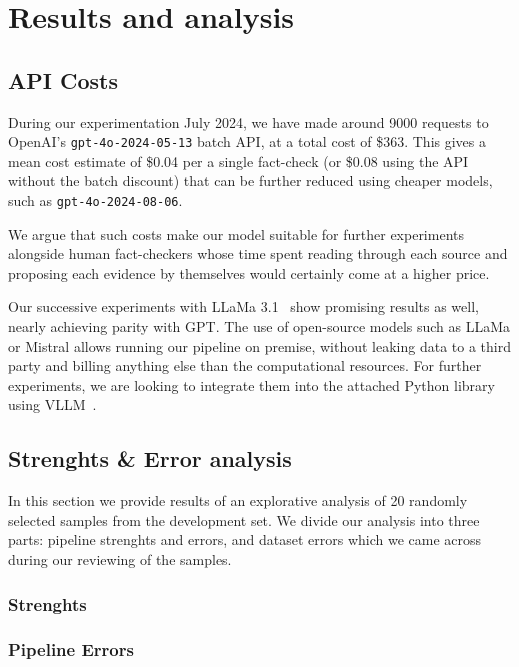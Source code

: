 
\section{Results and analysis}
\label{sec:results}



\subsection{API Costs}
During our experimentation July 2024, we have made around 9000 requests to OpenAI's \texttt{gpt-4o-2024-05-13} batch API, at a total cost of \$363.
This gives a mean cost estimate of \$0.04 per a single fact-check (or \$0.08 using the API without the batch discount) that can be further reduced using cheaper models, such as \texttt{gpt-4o-2024-08-06}.

We argue that such costs make our model suitable for further experiments alongside human fact-checkers whose time spent reading through each source and proposing each evidence by themselves would certainly come at a higher price.

Our successive experiments with LLaMa 3.1~\cite{meta2024llama31} show promising results as well, nearly achieving parity with GPT.
The use of open-source models such as LLaMa or Mistral allows running our pipeline on premise, without leaking data to a third party and billing anything else than the computational resources.
For further experiments, we are looking to integrate them into the attached Python library using VLLM~\cite{vllm}.

\subsection{Strenghts \& Error analysis}
In this section we provide results of an explorative analysis of 20 randomly selected samples from the development set. We divide our analysis into three parts: pipeline strenghts and errors, and dataset errors which we came across during our reviewing of the samples.

\subsubsection*{Strenghts}
\subsubsection*{Pipeline Errors}
